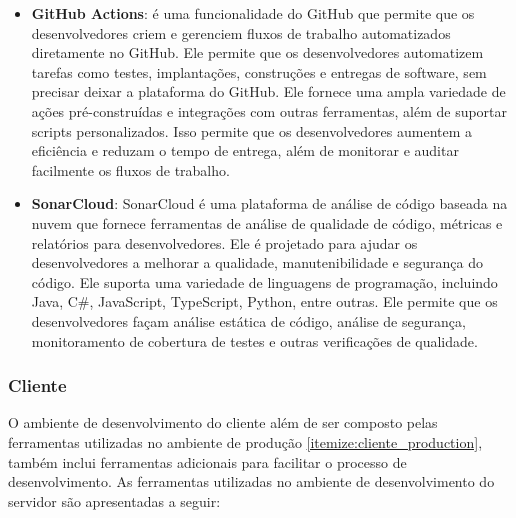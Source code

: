 \begin{itemize}
    \item \textbf{GitHub Actions}: é uma funcionalidade do GitHub que permite que os desenvolvedores criem e gerenciem fluxos de trabalho automatizados diretamente no GitHub. Ele permite que os desenvolvedores automatizem tarefas como testes, implantações, construções e entregas de software, sem precisar deixar a plataforma do GitHub. Ele fornece uma ampla variedade de ações pré-construídas e integrações com outras ferramentas, além de suportar scripts personalizados. Isso permite que os desenvolvedores aumentem a eficiência e reduzam o tempo de entrega, além de monitorar e auditar facilmente os fluxos de trabalho.
    \item \textbf{SonarCloud}: SonarCloud é uma plataforma de análise de código baseada na nuvem que fornece ferramentas de análise de qualidade de código, métricas e relatórios para desenvolvedores. Ele é projetado para ajudar os desenvolvedores a melhorar a qualidade, manutenibilidade e segurança do código. Ele suporta uma variedade de linguagens de programação, incluindo Java, C\#, JavaScript, TypeScript, Python, entre outras. Ele permite que os desenvolvedores façam análise estática de código, análise de segurança, monitoramento de cobertura de testes e outras verificações de qualidade.
\end{itemize}

\subsubsection{Cliente}

O ambiente de desenvolvimento do cliente além de ser composto pelas ferramentas utilizadas no ambiente de produção \ref{itemize:cliente_production}, também inclui ferramentas adicionais para facilitar o processo de desenvolvimento. As ferramentas utilizadas no ambiente de desenvolvimento do servidor são apresentadas a seguir:

